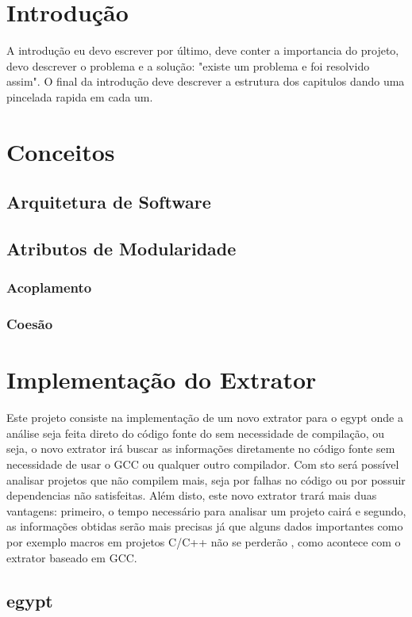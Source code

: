 \chapter{Introdução}

A introdução eu devo escrever por último, deve conter a importancia do projeto,
devo descrever o problema e a solução: "existe um problema e foi resolvido
assim". O final da introdução deve descrever a estrutura dos capitulos dando
uma pincelada rapida em cada um.

\chapter{Conceitos}
\section{Arquitetura de Software}
\section{Atributos de Modularidade}
\subsection{Acoplamento}
\subsection{Coesão}

\chapter{Implementação do Extrator}

Este projeto consiste na implementação de um novo extrator para o egypt onde a
análise seja feita direto do código fonte do sem necessidade de compilação, ou
seja, o novo extrator irá buscar as informações diretamente no código fonte sem
necessidade de usar o GCC ou qualquer outro compilador. Com sto será possível
analisar projetos que não compilem mais, seja por falhas no código ou por
possuir dependencias não satisfeitas. Além disto, este novo extrator trará mais
duas vantagens: primeiro, o tempo necessário para analisar um projeto cairá e
segundo, as informações obtidas serão mais precisas já que alguns dados
importantes como por exemplo macros em projetos C/C++ não se perderão
\cite{SourceVersusObjectCodeExtraction}, como acontece com o extrator baseado
em GCC.

\section{egypt}

